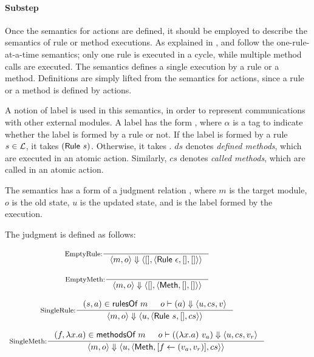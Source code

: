 \paragraph{Substep}
Once the semantics for actions are defined, it should be employed to
describe the semantics of rule or method executions. As explained in
, \Bluespec{} and \Kami{} follow the
one-rule-at-a-time semantics; only one rule is executed in a cycle,
while multiple method calls are executed. The \Substep{} semantics
defines a single execution by a rule or a method. Definitions are
simply lifted from the semantics for actions, since a rule or a method
is defined by actions.

A notion of label is used in this semantics, in order to represent
communications with other external modules. A label has the form
, where $\alpha$ is a tag to indicate whether
the label is formed by a rule or not. If the label is formed by a rule
$s \in \mathcal{L}$, it takes $(\textsf{Rule}\ s)$. Otherwise, it takes
\alphameth{}. $ds$ denotes \emph{defined methods}, which are executed
in an atomic action.  Similarly, $cs$ denotes \emph{called methods},
which are called in an atomic action.

The \Substep{} semantics has a form of a judgment relation
, where $m$ is the target module,
$o$ is the old state, $u$ is the updated state, and
 is the label formed by the execution.

\begin{definition}
  \label{def-semsstep}
  The judgment  is defined as follows:
  \begin{center}
    \begin{math}
      \begin{array}{c}
        \inference[EmptyRule:]{}
                  {\semsstep{m}{o}{\emptymap}
                    {\alpharule{\epsilon}}{\emptymap}{\emptymap}} \\
        \mbox{} \\
        \inference[EmptyMeth:]{}
                  {\semsstep{m}{o}{\emptymap}
                    {\alphameth}{\emptymap}{\emptymap}} \\
        \mbox{} \\
        \inference[SingleRule:]{\rulepair{s}{a} \in \rulesofm{m} & \semact{o}{a}{u}{cs}{v}}
                  {\semsstep{m}{o}{u}{\alpharule{s}}{\emptymap}{cs}} \\
        \mbox{} \\
        \inference[SingleMeth:]{\methodpair{f}{\lambda x.a} \in \methsofm{m} &
          \semact{o}{(\lambda x.a)\ v_a}{u}{cs}{v_r}}
                  {\semsstep{m}{o}{u}{\alphameth{}}{\lblupd{}{f}{(v_a, v_r)}}{cs}} \\
        \mbox{} \\
      \end{array}
    \end{math}
  \end{center}
\end{definition}

